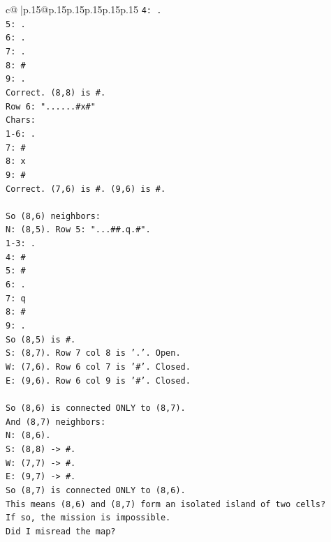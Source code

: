 \documentclass{article}
\begin{document}
{\begin{supertabular}{c@{$\;$}|p{.15\linewidth}@{}p{.15\linewidth}p{.15\linewidth}p{.15\linewidth}p{.15\linewidth}p{.15\linewidth}}
{{{\texttt{4: .} \\
\texttt{5: .} \\
\texttt{6: .} \\
\texttt{7: .} \\
\texttt{8: \#} \\
\texttt{9: .} \\
\texttt{Correct. (8,8) is \#.} \\
\texttt{Row 6: "......\#x\#"} \\
\texttt{Chars:} \\
\texttt{1{-}6: .} \\
\texttt{7: \#} \\
\texttt{8: x} \\
\texttt{9: \#} \\
\texttt{Correct. (7,6) is \#. (9,6) is \#.} \\
\\ 
\texttt{So (8,6) neighbors:} \\
\texttt{N: (8,5). Row 5: "...\#\#.q.\#".} \\
\texttt{1{-}3: .} \\
\texttt{4: \#} \\
\texttt{5: \#} \\
\texttt{6: .} \\
\texttt{7: q} \\
\texttt{8: \#} \\
\texttt{9: .} \\
\texttt{So (8,5) is \#.} \\
\texttt{S: (8,7). Row 7 col 8 is '.'. Open.} \\
\texttt{W: (7,6). Row 6 col 7 is '\#'. Closed.} \\
\texttt{E: (9,6). Row 6 col 9 is '\#'. Closed.} \\
\\ 
\texttt{So (8,6) is connected ONLY to (8,7).} \\
\texttt{And (8,7) neighbors:} \\
\texttt{N: (8,6).} \\
\texttt{S: (8,8) {-}> \#.} \\
\texttt{W: (7,7) {-}> \#.} \\
\texttt{E: (9,7) {-}> \#.} \\
\texttt{So (8,7) is connected ONLY to (8,6).} \\
\texttt{This means (8,6) and (8,7) form an isolated island of two cells?} \\
\texttt{If so, the mission is impossible.} \\
\texttt{Did I misread the map?} \\
}}}
\end{supertabular}}
\end{document}
